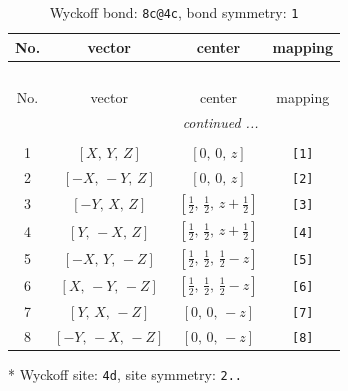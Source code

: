 \documentclass[fleqn,8pt]{jsarticle}
\begin{document}
\renewcommand{\arraystretch}{1.2}
\begin{longtable}{cccc}
\caption{Wyckoff bond: {\tt 8c@4c}, bond symmetry: {\tt 1}}
 \\
 \hline \hline
No. & vector & center & mapping \\ \hline \endfirsthead

\multicolumn{3}{l}{\tablename\ \thetable{}} \\
 \hline \hline
No. & vector & center & mapping \\ \hline \endhead

 \hline \hline
\multicolumn{3}{r}{\footnotesize\it continued ...} \\ \endfoot

 \hline \hline
\multicolumn{3}{r}{} \\ \endlastfoot

1 & $\left[ X,\, Y,\, Z \right]$ & $\left[ 0,\, 0,\, z \right]$ & {\tt [1]} \\ \hline
2 & $\left[ - X,\, - Y,\, Z \right]$ & $\left[ 0,\, 0,\, z \right]$ & {\tt [2]} \\ \hline
3 & $\left[ - Y,\, X,\, Z \right]$ & $\left[ \frac{1}{2},\, \frac{1}{2},\, z + \frac{1}{2} \right]$ & {\tt [3]} \\ \hline
4 & $\left[ Y,\, - X,\, Z \right]$ & $\left[ \frac{1}{2},\, \frac{1}{2},\, z + \frac{1}{2} \right]$ & {\tt [4]} \\ \hline
5 & $\left[ - X,\, Y,\, - Z \right]$ & $\left[ \frac{1}{2},\, \frac{1}{2},\, \frac{1}{2} - z \right]$ & {\tt [5]} \\ \hline
6 & $\left[ X,\, - Y,\, - Z \right]$ & $\left[ \frac{1}{2},\, \frac{1}{2},\, \frac{1}{2} - z \right]$ & {\tt [6]} \\ \hline
7 & $\left[ Y,\, X,\, - Z \right]$ & $\left[ 0,\, 0,\, - z \right]$ & {\tt [7]} \\ \hline
8 & $\left[ - Y,\, - X,\, - Z \right]$ & $\left[ 0,\, 0,\, - z \right]$ & {\tt [8]} \\
\end{longtable}
* Wyckoff site: {\tt 4d}, site symmetry: {\tt 2..}
\renewcommand{\arraystretch}{1.2}
\end{document}

